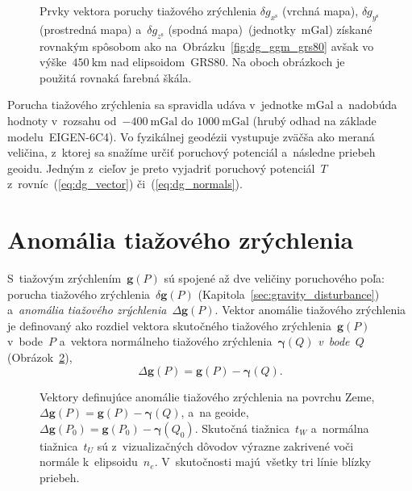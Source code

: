 \documentclass[a4paper,12pt]{book}
\let\vec\mathbf
\begin{document}
\begin{figure}
\caption{Prvky vektora poruchy tiažového zrýchlenia $\delta g_{x^\mathrm{s}}$ 
(vrchná mapa), $\delta g_{y^\mathrm{s}}$ (prostredná mapa) a~$\delta 
g_{z^\mathrm{s}}$ (spodná mapa)~(jednotky~$\mathrm{mGal}$) získané rovnakým 
spôsobom ako na~Obrázku~\ref{fig:dg_ggm_grs80} avšak vo výške~$450\ 
\mathrm{km}$ nad elipsoidom~GRS80.  Na oboch obrázkoch je použitá rovnaká 
farebná škála.}
\label{fig:dg_ggm_450km}
\end{figure}

Porucha tiažového zrýchlenia sa spravidla udáva v~jednotke mGal a~nadobúda 
hodnoty v~rozsahu od~$-400\ \mathrm{mGal}$ do $1000\ \mathrm{mGal}$ (hrubý 
odhad na základe modelu~EIGEN-6C4).  Vo fyzikálnej geodézii vystupuje zväčša 
ako meraná veličina, z~ktorej sa snažíme určiť poruchový potenciál a~následne 
priebeh geoidu.  Jedným z~cieľov je preto vyjadriť poruchový potenciál~$T$ 
z~rovníc~(\ref{eq:dg_vector}) či~(\ref{eq:dg_normals}).





\section{Anomália tiažového zrýchlenia}
\label{sec:gravity_anomaly}

S~tiažovým zrýchlením~$\vec g(P)$ sú spojené až dve veličiny poruchového poľa: 
porucha tiažového zrýchlenia~$\delta \vec g(P)$ 
(Kapitola~\ref{sec:gravity_disturbance}) a~\emph{anomália tiažového 
zrýchlenia}~$\Delta \vec g(P)$.  Vektor anomálie tiažového zrýchlenia je 
definovaný ako rozdiel vektora skutočného tiažového zrýchlenia~$\vec g(P)$ 
v~bode~$P$ a~vektora normálneho tiažového zrýchlenia~$\boldsymbol\gamma(Q)$ 
\emph{v~bode~$Q$} (Obrázok~\ref{fig:gravity_anomaly}),
%
\begin{equation}
\label{eq:Dg_vector_earth}
\Delta \vec g(P) = \vec g(P) - \boldsymbol\gamma (Q).
\end{equation}

\begin{figure}[bt]
\centering

\caption{Vektory definujúce anomálie tiažového zrýchlenia na povrchu 
Zeme,~$\Delta \vec g(P) = \vec g(P) - \boldsymbol \gamma(Q)$, a~na geoide, 
$\Delta \vec g(P_0) = \vec g(P_0) - \boldsymbol\gamma(Q_0)$.  Skutočná 
tiažnica~$t_W$ a~normálna tiažnica~$t_U$ sú z~vizualizačných dôvodov výrazne 
zakrivené voči normále k~elipsoidu~$n_e$.  V~skutočnosti majú~všetky tri línie 
blízky priebeh.}
\label{fig:gravity_anomaly}
\end{figure}
\end{document}
